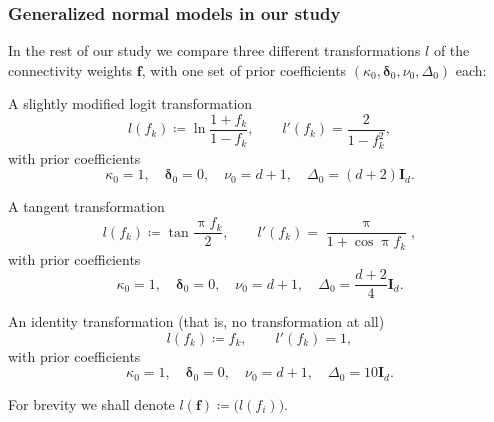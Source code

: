 \documentclass[%
]{frontiersSCNS-nologo} %
\newcommand*{\defd}{\coloneqq}%
\newcommand*{\pu}{\uppi}%
\renewcommand*{\|}{\mathpunct{|}}%
\DeclarePairedDelimiter\opop{]}{[}
\newcommand*{\yxx}{f}
\newcommand*{\yx}{\bm{\yxx}}
\newcommand*{\yd}{d}
\newcommand*{\ytr}{l}
\newcommand*{\RR}{\mathbf{R}}
\newcommand*{\ymu}{\bm{\delta}}
\newcommand*{\yka}{\kappa}
\newcommand*{\ynu}{\nu}
\newcommand*{\yLa}{\bm{\varDelta}}
\newcommand*{\ymuo}{\ymu_0}
\newcommand*{\ykao}{\yka_0}
\newcommand*{\ynuo}{\ynu_0}
\newcommand*{\yLao}{\yLa_0}
\newcommand*{\id}{\bm{I}}
\begin{document}
\subsubsection{Generalized normal models in our study}
\label{sec:our_models}

In the rest of our study we compare three different transformations $\ytr$
of the connectivity weights $\yx$, with one set of prior coefficients
$(\ykao,\ymuo,\ynuo,\yLao)$ each:
\begin{description}[wide]
\item[Logit-normal model: ] A slightly modified logit transformation
  \begin{equation}
  \label{eq:logit_tr}
\ytr(\yxx_k) \defd \ln\frac{1+\yxx_k}{1-\yxx_k},
\qquad
\ytr'(\yxx_k) = \frac{2}{1-\yxx_k^2},
\end{equation}
with prior coefficients
  \begin{equation}
    \label{eq:logit_tr_consts_flat}
    \ykao = 1,\quad \ymuo=0,\quad\ynuo=\yd+1,\quad\yLao = (\yd+2)\id_{\yd}.
  \end{equation}


\item[Tangent-normal model: ] A tangent transformation
  \begin{equation}
  \label{eq:tan_tr}
  \ytr(\yxx_k) \defd \tan\frac{\pu \yxx_k}{2},
\qquad
\ytr'(\yxx_k) = \frac{\pu}{1+\cos\pu\yxx_k},
\end{equation}
with prior coefficients
  \begin{equation}
    \label{eq:tan_tr_consts_flat}  
    \ykao = 1,\quad \ymuo=0,\quad\ynuo=\yd+1,\quad\yLao = \frac{\yd+2}{4}\id_{\yd}.   
  \end{equation}

\item[Normal model: ] An identity transformation (that is, no transformation at all)
  \begin{equation}
  \label{eq:id_tr}
  \ytr(\yxx_k) \defd \yxx_k,
\qquad
\ytr'(\yxx_k) = 1,
\end{equation}
with prior coefficients
  \begin{equation}
    \label{eq:id_tr_consts_flat}  
    \ykao = 1,\quad \ymuo=0,\quad\ynuo=\yd+1,\quad\yLao = 10\id_{\yd}. 
  \end{equation}
\end{description}
For brevity we shall denote
$\ytr(\yx) \defd \bigl( \ytr(\yxx_i) \bigr)$.
\end{document}
